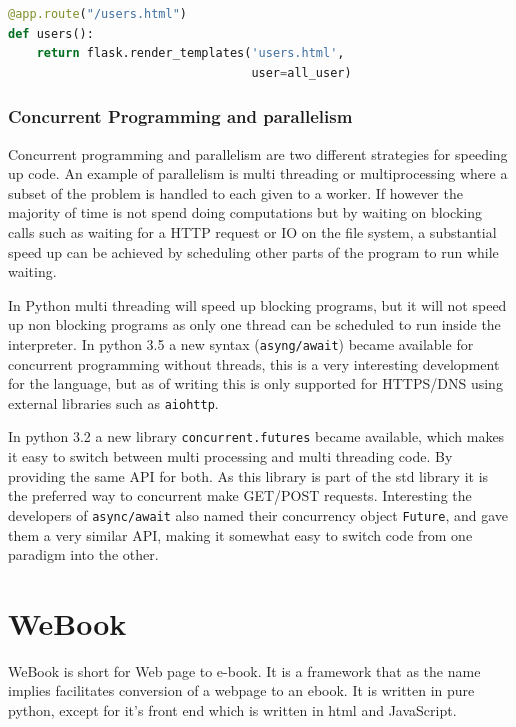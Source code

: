 \documentclass[]{report}   %
\begin{document}
\begin{minipage}{\linewidth}
\begin{lstlisting}[language=python, label={lst:render-template},
                   caption={Flask render\_template, renders a Jinja 2 template}]
@app.route("/users.html")
def users():
    return flask.render_templates('users.html', 
                                  user=all_user)
\end{lstlisting}
\end{minipage}

\subsection{Concurrent Programming and parallelism}
\label{sec:concurrent_programming}
Concurrent programming and parallelism are two different strategies for
speeding up code. An example of parallelism is multi threading or
multiprocessing where a subset of the problem is handled to each given to a
worker. If however the majority of time is not spend doing computations but by
waiting on blocking calls such as waiting for a HTTP request or IO on the file
system, a substantial speed up can be achieved by scheduling other parts of the
program to run while waiting.

In Python multi threading will speed up blocking programs, but it will not
speed up non blocking programs as only one thread can be scheduled to run
inside the interpreter. In python 3.5 a new syntax (\texttt{asyng/await})
became available for concurrent programming without threads, this is a very
interesting development for the language, but as of writing this is only
supported for HTTPS/DNS using external libraries such as \texttt{aiohttp}. 

In python 3.2 a new library
\texttt{concurrent.futures}\cite{py_concurrent_futures} became available, which
makes it easy to switch between multi processing and multi threading code. By
providing the same API for both. As this library is part of the std library it
is the preferred way to concurrent make GET/POST requests. Interesting the
developers of \texttt{async/await} also named their concurrency object
\texttt{Future}, and gave them a very similar API, making it somewhat easy to
switch code from one paradigm into the other. 


\chapter{WeBook}
WeBook is short for Web page to e-book. It is a framework that as the name
implies facilitates conversion of a webpage to an ebook. It is written in pure
python, except for it's front end which is written in html and JavaScript.
\end{document}
